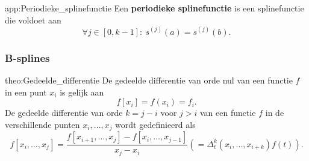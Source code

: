 \begin{app}{app:Periodieke_splinefunctie}
    Een \textbf{periodieke splinefunctie} is een splinefunctie die voldoet aan
    \begin{equation*}
        \forall j \in [0,k-1]:\ s^{(j)}(a) = s^{(j)}(b).
    \end{equation*}
    \vspace{-0.5cm}
\end{app}

\subsubsection{B-splines}

\vspace{0.5cm}

\begin{theo}{theo:Gedeelde_differentie}
    De gedeelde differentie van orde nul van een functie $f$ in een punt $x_i$ is gelijk aan 
    \begin{equation*}
        f[x_i] = f(x_i) = f_i.
    \end{equation*}
    De gedeelde differentie van orde $k=j-i$ voor $j>i$ van een functie $f$ in de verschillende punten $x_i,\ldots,x_j$ wordt gedefinieerd als 
    \begin{equation*}
        f[x_i,\ldots,x_j] = \frac{f[x_{i+1},\ldots,x_j] - f[x_i,\ldots,x_{j-1}]}{x_j - x_i} \left(= \Delta_t^k(x_i,\ldots,x_{i+k}) f(t)\right).
    \end{equation*}
    \vspace{-0.4cm}
\end{theo}

